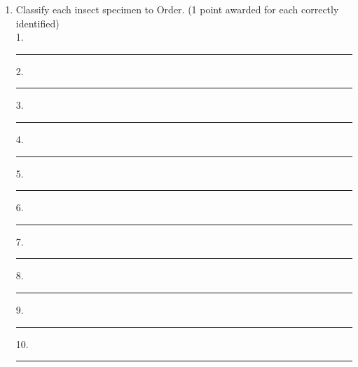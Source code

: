 \documentclass[letter,12pt]{scrartcl}
\begin{document}
\begin{enumerate}
		\newpage
		
		\item Classify each insect specimen to Order. (1 point awarded for each correctly identified)\\
		1.\newline\hrule
		2.\newline\hrule
		3.\newline\hrule
		4.\newline\hrule
		5.\newline\hrule
		6.\newline\hrule
		7.\newline\hrule
		8.\newline\hrule
		9.\newline\hrule
		10.\newline\hrule
		
	\end{enumerate}
\end{document}
